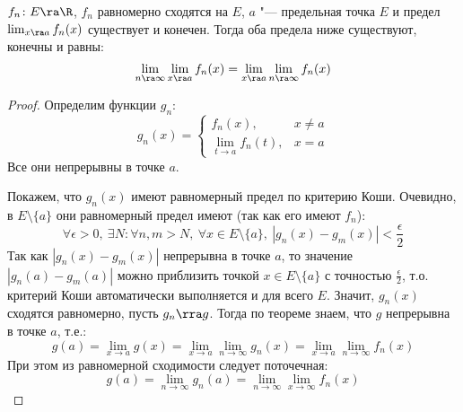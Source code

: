 \begin{conseq}
	$f_n\colon E \ra \R$, $f_n$ равномерно сходятся на $E$, $a$ "--- предельная точка $E$ и предел $\lim_{x \ra a} f_n(x)$ существует и конечен.
	Тогда оба предела ниже существуют, конечны и равны:
	\[ \lim_{n \ra \infty} \lim_{x \ra a} f_n(x) = \lim_{x \ra a} \lim_{n \ra \infty} f_n(x) \]
\end{conseq}
\begin{proof}
	Определим функции $g_n$:
	\[
		g_n(x) =
		\begin{cases}
			f_n(x), &x \neq a \\
			\lim\limits_{t \to a} f_n(t), &x = a
		\end{cases}
	\]
	Все они непрерывны в точке $a$.

	Покажем, что $g_n(x)$ имеют равномерный предел по критерию Коши.
	Очевидно, в $E \setminus \{a\}$ они равномерный предел имеют (так как его имеют $f_n$):
	\[
		\forall \epsilon > 0,\ 
		\exists N \colon
		\forall n, m > N,\ 
		\forall x \in E \setminus \{ a \},\ 
		|g_n(x) - g_m(x)| < \frac{\epsilon}{2}
	\]
	Так как $|g_n(x)-g_m(x)|$ непрерывна в точке $a$, то значение $|g_n(a)-g_m(a)|$ можно
	приблизить точкой $x \in E \setminus \{ a \}$ с точностью $\frac{\epsilon}{2}$, т.о.
	критерий Коши автоматически выполняется и для всего $E$.
	Значит, $g_n(x)$ сходятся равномерно, пусть $g_n \rra g$.
	Тогда по теореме знаем, что $g$ непрерывна в точке $a$, т.е.:
	\[
		g(a) = \lim_{x \to a} g(x)
		= \lim_{x \to a} \lim_{n \to \infty} g_n(x)
		= \lim_{x \to a} \lim_{n \to \infty} f_n(x)
	\]
	При этом из равномерной сходимости следует поточечная:
	\[
		g(a) = \lim_{n\to\infty} g_n(a)
		= \lim_{n\to\infty} \lim_{x\to\infty} f_n(x)
	\]
\end{proof}

